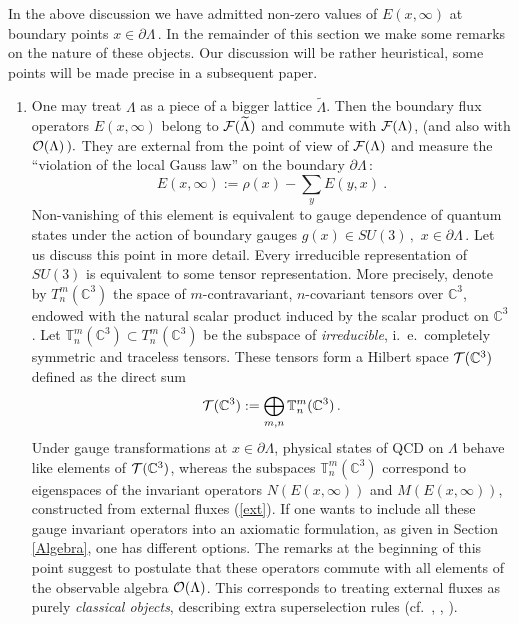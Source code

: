 \documentclass[a4paper,12pt]{article}
\begin{document}
In the above discussion we have admitted non-zero values of $E(x,
\infty )$ at boundary points $x \in \partial \Lambda \, .$ In the
remainder of this section we make some remarks on the nature of
these objects. Our discussion will be rather heuristical, some
points will be made precise in a subsequent paper.
\begin{enumerate}
\item
One may treat $\Lambda$ as a piece of a bigger lattice
$\widetilde{\Lambda}$. Then the boundary flux operators $E(x,
\infty )$ belong to ${\cal F}(\widetilde{\Lambda})$ and commute
with ${\cal F}(\Lambda)$, (and also with ${\cal O}(\Lambda) \,) .$
They are external from the point of view of ${\cal F}(\Lambda)$
and measure the  ``violation of the local Gauss law'' on the
boundary $\partial \Lambda \, :$
\begin{equation}\label{ext}
E(x,\infty) := {\rho}(x) - \sum_y E(y,x)  \ .
\end{equation}
Non-vanishing of this element is equivalent to gauge dependence of
quantum states under the action of boundary gauges $g(x) \in SU(3)
\, , $ $x \in \partial \Lambda \, .$ Let us discuss this point in
more detail. Every irreducible representation of $SU(3)$ is
equivalent to some tensor representation. More precisely, denote
by $T^m_n({\mathbb C}^3)$ the space of $m$-contravariant,
$n$-covariant tensors over ${\mathbb C}^3$, endowed with the
natural scalar product induced by the scalar product on ${\mathbb
C}^3$. Let ${{\mathbb T}}^m_n({\mathbb C}^3) \subset
T^m_n({\mathbb C}^3)$ be the subspace of {\em irreducible},
i.~e.~completely symmetric and traceless tensors. These tensors
form a Hilbert space ${\cal T}({\mathbb C}^3)$ defined as the
direct sum
\begin{equation}
{\cal T}({\mathbb C}^3) := \bigoplus_{m,n} {{{\mathbb
T}}}^m_n({\mathbb C}^3) \, .
\end{equation}
Under gauge transformations at $x \in \partial\Lambda$, physical
states of QCD on $\Lambda$ behave like elements of ${\cal
T}({\mathbb C}^3)$, whereas the subspaces ${{\mathbb
T}}^m_n({\mathbb C}^3)$ correspond to eigenspaces of the invariant
operators $N(E(x,\infty))$ and $M(E(x,\infty))$, constructed from
external fluxes (\ref{ext}). If one wants to include all these
gauge invariant operators into an axiomatic formulation, as given
in Section \ref{Algebra}, one has different options. The remarks
at the beginning of this point suggest to postulate that these
operators commute with all elements of the observable algebra
${\cal O}(\Lambda )$. This corresponds to treating external fluxes
as purely {\em classical objects}, describing extra superselection
rules (cf.~\cite{Bu}, \cite{SW1}, \cite{S}).


\end{enumerate}
\end{document}
